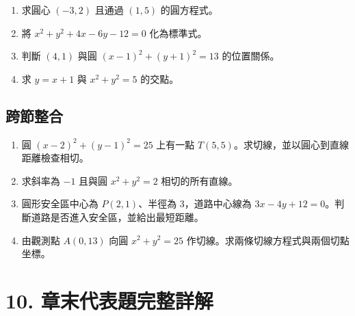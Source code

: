 \documentclass[11pt,a4paper]{article}
\providecommand{\tightlist}{%
  \setlength{\itemsep}{0pt}\setlength{\parskip}{0pt}}
\begin{document}
\begin{enumerate}
\def\labelenumi{\arabic{enumi}.}
\setcounter{enumi}{8}
\tightlist
\item
  求圓心 \((-3,2)\) 且通過 \((1,5)\) 的圓方程式。
\item
  將 \(x^2+y^2+4x-6y-12=0\) 化為標準式。
\item
  判斷 \((4,1)\) 與圓 \((x-1)^2+(y+1)^2=13\) 的位置關係。
\item
  求 \(y=x+1\) 與 \(x^2+y^2=5\) 的交點。
\end{enumerate}

\subsection{跨節整合}\label{ux8de8ux7bc0ux6574ux5408}

\begin{enumerate}
\def\labelenumi{\arabic{enumi}.}
\setcounter{enumi}{12}
\tightlist
\item
  圓 \((x-2)^2+(y-1)^2=25\) 上有一點 \(T(5,5)\)。求切線，並以圓心到直線距離檢查相切。
\item
  求斜率為 \(-1\) 且與圓 \(x^2+y^2=2\) 相切的所有直線。
\item
  圓形安全區中心為 \(P(2,1)\)、半徑為 \(3\)，道路中心線為 \(3x-4y+12=0\)。判斷道路是否進入安全區，並給出最短距離。
\item
  由觀測點 \(A(0,13)\) 向圓 \(x^2+y^2=25\) 作切線。求兩條切線方程式與兩個切點坐標。
\end{enumerate}

\section{10. 章末代表題完整詳解}\label{ux7ae0ux672bux4ee3ux8868ux984cux5b8cux6574ux8a73ux89e3}
\end{document}
